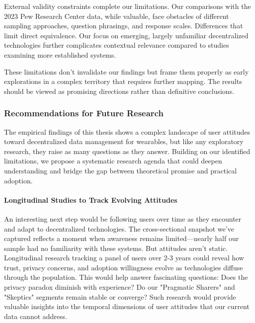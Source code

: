 	External validity constraints complete our limitations. Our comparisons with the 2023 Pew Research Center data, while valuable, face obstacles of different sampling approaches, question phrasings, and response scales. 
	Differences that limit direct equivalence. Our focus on emerging, largely unfamiliar decentralized technologies further complicates contextual relevance compared to studies examining more established systems.
	
	These limitations don't invalidate our findings but frame them properly as early explorations in a complex territory that requires further mapping. The results should be viewed as promising directions rather than definitive conclusions.
	\subsubsection{Recommendations for Future Research}

	The empirical findings of this thesis shows a complex landscape of user attitudes toward decentralized data management for wearables, but like any exploratory research, they raise as many questions as they answer. Building on our identified limitations, we propose a systematic research agenda that could deepen understanding and bridge the gap between theoretical promise and practical adoption.
	
	\paragraph{Longitudinal Studies to Track Evolving Attitudes}
	An interesting next step would be following users over time as they encounter and adapt to decentralized technologies. The cross-sectional snapshot we've captured reflects a moment when awareness remains limited—nearly half our sample had no familiarity with these systems. But attitudes aren't static. Longitudinal research tracking a panel of users over 2-3 years could reveal how trust, privacy concerns, and adoption willingness evolve as technologies diffuse through the population. This would help answer fascinating questions: Does the privacy paradox diminish with experience? Do our "Pragmatic Sharers" and "Skeptics" segments remain stable or converge? Such research would provide valuable insights into the temporal dimensions of user attitudes that our current data cannot address.
	
